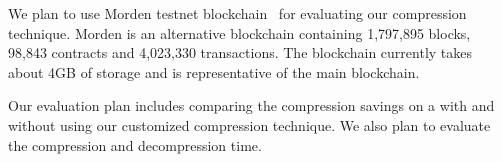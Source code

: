 
We plan to use 
Morden testnet blockchain~\cite{testnet} for evaluating our compression technique. 
Morden is an alternative blockchain containing 1,797,895 blocks, 98,843 contracts and
4,023,330 transactions.
The blockchain currently takes about 4GB of storage and is representative of
the main blockchain.

Our evaluation plan includes comparing the compression savings on a 
with and without using our customized compression technique. 
We also plan to evaluate the compression and decompression time.
